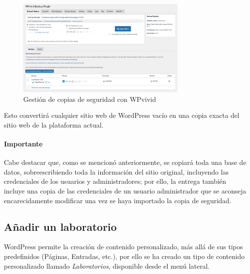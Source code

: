 \begin{appendices}
                    \begin{figure}
                        \centering

                        \includegraphics[width=0.75\textwidth]{images/Capturas/localhost/wpvivid.png}
                        \caption{Gestión de copias de seguridad con WPvivid}
                        \label{fig:wpvivid}
                    \end{figure}

                    Esto convertirá cualquier sitio web de WordPress vacío en una copia exacta del sitio web de la plataforma actual.
                    
                    \paragraph{Importante}
                    
                        Cabe destacar que, como se mencionó anteriormente, se copiará toda una base de datos, sobreescribiendo toda la información del sitio original, incluyendo las credenciales de los usuarios y administradores; por ello, la entrega también incluye una copia de las credenciales de un usuario administrador que se aconseja encarecidamente modificar una vez se haya importado la copia de seguridad.

            \subsection{Añadir un laboratorio}

                WordPress permite la creación de contenido personalizado, más allá de sus tipos predefinidos (Páginas, Entradas, etc.), por ello se ha creado un tipo de contenido personalizado llamado \textit{Laboratorios}, disponible desde el menú lateral.

                \begin{figure}[!htbp]
                    \centering


\end{figure}
\end{appendices}
